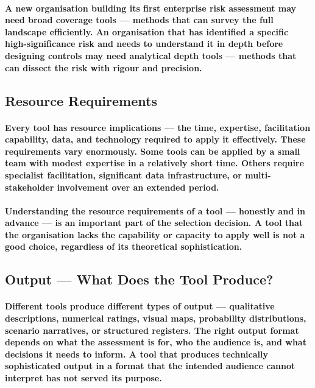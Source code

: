 \paragraph{A new organisation building its first enterprise risk assessment may need broad coverage tools — methods that can survey the full landscape efficiently. An organisation that has identified a specific high-significance risk and needs to understand it in depth before designing controls may need analytical depth tools — methods that can dissect the risk with rigour and precision.}

\subsection{Resource Requirements}
\paragraph{Every tool has resource implications — the time, expertise, facilitation capability, data, and technology required to apply it effectively. These requirements vary enormously. Some tools can be applied by a small team with modest expertise in a relatively short time. Others require specialist facilitation, significant data infrastructure, or multi-stakeholder involvement over an extended period.}
\paragraph{Understanding the resource requirements of a tool — honestly and in advance — is an important part of the selection decision. A tool that the organisation lacks the capability or capacity to apply well is not a good choice, regardless of its theoretical sophistication.}

\subsection{Output — What Does the Tool Produce?}
\paragraph{Different tools produce different types of output — qualitative descriptions, numerical ratings, visual maps, probability distributions, scenario narratives, or structured registers. The right output format depends on what the assessment is for, who the audience is, and what decisions it needs to inform. A tool that produces technically sophisticated output in a format that the intended audience cannot interpret has not served its purpose.}


